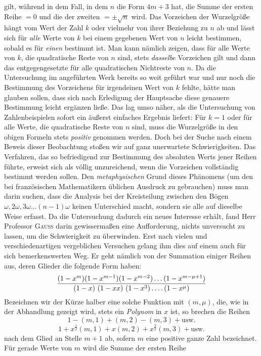 gilt, während in dem Fall, in dem $n$ die Form $4m+3$ hat, die Summe der ersten Reihe $=0$ und die der zweiten $=\pm\surd n$ wird. Das Vorzeichen der Wurzelgröße hängt vom Wert der Zahl $k$ oder vielmehr von ihrer Beziehung zu $n$ ab und lässt sich für \emph{alle} Werte von $k$ bei einem gegebenen Wert von $n$ leicht bestimmen, sobald es für \emph{einen} bestimmt ist. Man kann nämlich zeigen, dass für alle Werte von $k$, die quadratische Reste von $n$ sind, stets \emph{dasselbe} Vorzeichen gilt und dann das entgegengesetzte für alle quadratischen Nichtreste von $n$. Da die Untersuchung im angeführten Werk bereits so weit geführt war und nur noch die Bestimmung des Vorzeichens für irgendeinen Wert von $k$ fehlte, hätte man glauben sollen, dass sich nach Erledigung der Hauptsache diese genauere Bestimmung leicht ergänzen ließe. Das lag umso näher, als die Untersuchung von Zahlenbeispielen sofort ein äußerst einfaches Ergebnis liefert: Für $k=1$ oder für alle Werte, die quadratische Reste von $n$ sind, muss die Wurzelgröße in den obigen Formeln stets \emph{positiv} genommen werden. Doch bei der Suche nach einem Beweis dieser Beobachtung stoßen wir auf ganz unerwartete Schwierigkeiten. Das Verfahren, das so befriedigend zur Bestimmung des absoluten Werts jener Reihen führte, erweist sich als völlig unzureichend, wenn die Vorzeichen vollständig bestimmt werden sollen. Den \emph{metaphysischen} Grund dieses Phänomens (um den bei französischen Mathematikern üblichen Ausdruck zu gebrauchen) muss man darin suchen, dass die Analysis bei der Kreisteilung zwischen den Bögen $\omega,2\omega,3\omega\ldots(n-1)\omega$ keinen Unterschied macht, sondern sie alle auf dieselbe Weise erfasst. Da die Untersuchung dadurch ein neues Interesse erhält, fand Herr Professor \textsc{Gauss} darin gewissermaßen eine Aufforderung, nichts unversucht zu lassen, um die Schwierigkeit zu überwinden. Erst nach vielen und verschiedenartigen vergeblichen Versuchen gelang ihm dies auf einem auch für sich bemerkenswerten Weg. Er geht nämlich von der Summation einiger Reihen aus, deren Glieder die folgende Form haben:
\[
\frac{(1-x^m)(1-x^{m-1})(1-x^{m-2})\ldots(1-x^{m-\mu+1})}{(1-x)\ (1-xx)\ (1-x^3)\dotsfour(1-x^\mu)}
\]
Bezeichnen wir der Kürze halber eine solche Funktion mit $(m,\mu)$, die, wie in der Abhandlung gezeigt wird, stets ein \emph{Polynom} in $x$ ist, so brechen die Reihen
%
\[
1-(m,1)+(m,2)-(m,3)+\text{usw.}
\]
\[
1+x^{\frac12}(m,1)+x(m,2)+x^{\frac32}(m,3)+\text{usw.}
\]
nach dem Glied an Stelle $m+1$ ab, sofern $m$ eine positive ganze Zahl bezeichnet. Für gerade Werte von $m$ wird die Summe der ersten Reihe
